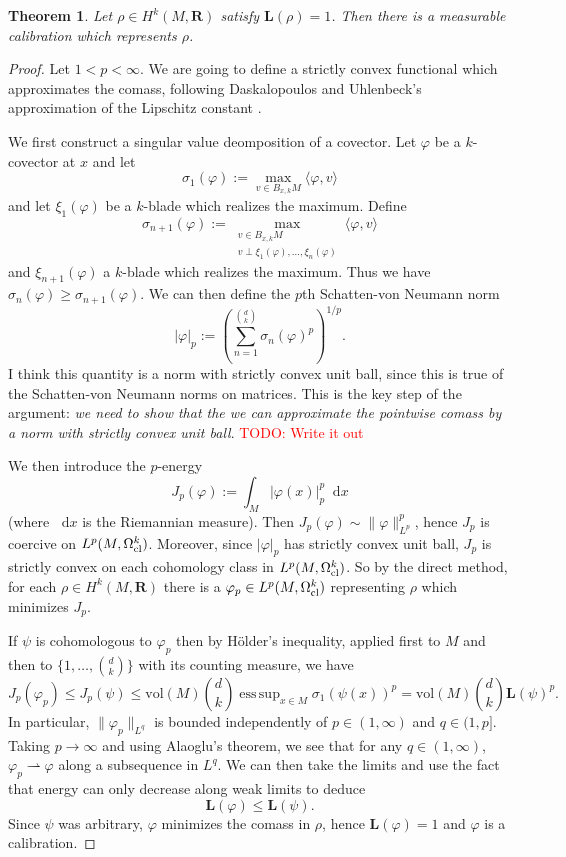 \documentclass[reqno,11pt]{amsart}
\newcommand{\RR}{\mathbf{R}}
\newcommand*\dif{\mathop{}\!\mathrm{d}}
\newcommand{\vol}{\mathrm{vol}}
\newcommand{\Comass}{\mathbf L}
\newcommand{\weakto}{\rightharpoonup}
\newtheorem{theorem}{Theorem}
\theoremstyle{definition}
\DeclareMathOperator*{\esssup}{ess\,sup}
\numberwithin{equation}{section}
\newcommand\todo[1]{\textcolor{red}{TODO: #1}}
\begin{document}
\begin{theorem}\label{existence of calibrations}
Let $\rho \in H^k(M, \RR)$ satisfy $\Comass(\rho) = 1$.
Then there is a measurable calibration which represents $\rho$.
\end{theorem}
\begin{proof}
Let $1 < p < \infty$.
We are going to define a strictly convex functional which approximates the comass, following Daskalopoulos and Uhlenbeck's approximation of the Lipschitz constant \cite{daskalopoulos2022}.

We first construct a singular value deomposition of a covector.
Let $\varphi$ be a $k$-covector at $x$ and let 
$$\sigma_1(\varphi) := \max_{v \in B_{x, k} M} \langle \varphi, v\rangle$$
and let $\xi_1(\varphi)$ be a $k$-blade which realizes the maximum.
Define 
$$\sigma_{n + 1}(\varphi) := \max_{\substack{v \in B_{x, k} M \\ v \perp \xi_1(\varphi), \dots, \xi_n(\varphi)}} \langle \varphi, v\rangle$$
and $\xi_{n + 1}(\varphi)$ a $k$-blade which realizes the maximum.
Thus we have $\sigma_n(\varphi) \geq \sigma_{n + 1}(\varphi)$.
We can then define the $p$th Schatten-von Neumann norm 
$$|\varphi|_p := \left(\sum_{n=1}^{\binom dk} \sigma_n(\varphi)^p\right)^{1/p}.$$
I think this quantity is a norm with strictly convex unit ball, since this is true of the Schatten-von Neumann norms on matrices.
This is the key step of the argument: \emph{we need to show that the we can approximate the pointwise comass by a norm with strictly convex unit ball}. \todo{Write it out}

We then introduce the $p$-energy
$$J_p(\varphi) := \int_M |\varphi(x)|_p^p \dif x$$
(where $\dif x$ is the Riemannian measure).
Then $J_p(\varphi) \sim \|\varphi\|_{L^p}^p$, hence $J_p$ is coercive on $L^p(M, \Omega^k_{\rm cl})$.
Moreover, since $|\varphi|_p$ has strictly convex unit ball, $J_p$ is strictly convex on each cohomology class in $L^p(M, \Omega^k_{\rm cl})$.
So by the direct method, for each $\rho \in H^k(M, \RR)$ there is a $\varphi_p \in L^p(M, \Omega^k_{\rm cl})$ representing $\rho$ which minimizes $J_p$.

If $\psi$ is cohomologous to $\varphi_p$ then by H\"older's inequality, applied first to $M$ and then to $\{1, \dots, \binom dk\}$ with its counting measure, we have
$$J_p(\varphi_p) \leq J_p(\psi) \leq \vol(M) \binom dk \esssup_{x \in M} \sigma_1(\psi(x))^p = \vol(M) \binom dk \Comass(\psi)^p.$$
In particular, $\|\varphi_p\|_{L^q}$ is bounded independently of $p \in (1, \infty)$ and $q \in (1, p]$.
Taking $p \to \infty$ and using Alaoglu's theorem, we see that for any $q \in (1, \infty)$, $\varphi_p \weakto \varphi$ along a subsequence in $L^q$.
We can then take the limits and use the fact that energy can only decrease along weak limits to deduce 
$$\Comass(\varphi) \leq \Comass(\psi).$$
Since $\psi$ was arbitrary, $\varphi$ minimizes the comass in $\rho$, hence $\Comass(\varphi) = 1$ and $\varphi$ is a calibration.
\end{proof}
\end{document}
